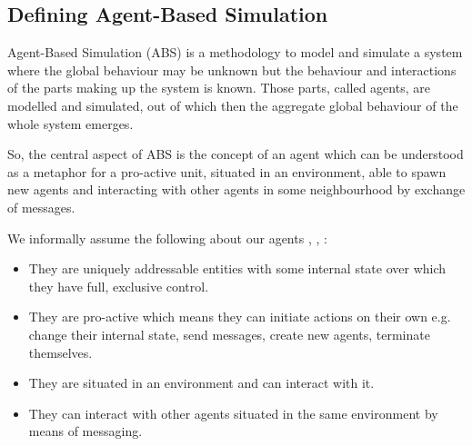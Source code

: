 \subsection{Defining Agent-Based Simulation}
\label{sec:defining_abs}

Agent-Based Simulation (ABS) is a methodology to model and simulate a system where the global behaviour may be unknown but the behaviour and interactions of the parts making up the system is known. Those parts, called agents, are modelled and simulated, out of which then the aggregate global behaviour of the whole system emerges.

So, the central aspect of ABS is the concept of an agent which can be understood as a metaphor for a pro-active unit, situated in an environment, able to spawn new agents and interacting with other agents in some neighbourhood by exchange of messages. 

We informally assume the following about our agents \cite{siebers_introduction_2008}, \cite{wooldridge_introduction_2009}, \cite{macal_everything_2016}:

\begin{itemize}
	\item They are uniquely addressable entities with some internal state over which they have full, exclusive control.
	\item They are pro-active which means they can initiate actions on their own e.g. change their internal state, send messages, create new agents, terminate themselves.
	\item They are situated in an environment and can interact with it.
	\item They can interact with other agents situated in the same environment by means of messaging.
\end{itemize} 
